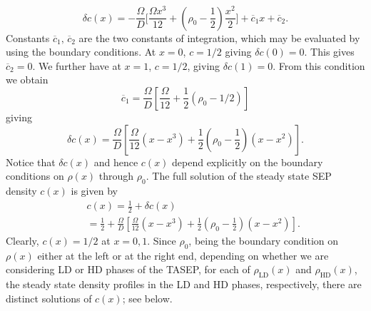 \documentclass[aps,pre,twocolumn,superscriptaddress,amsmath,amssymb,longbibliography,floatfix,nofootinbib]{revtex4}
\begin{document}
{\begin{equation}
  \delta c(x)=  -\frac{\Omega}{D}\bigg[\frac{\Omega x^3}{12} + (\rho_0-\frac{1}{2})\frac{x^2}{2}\bigg] + \overline c_1x + \overline c_2.
\end{equation}
 Constants $\overline c_1,\,\overline c_2$ are the two constants of integration, which may be evaluated by using the boundary conditions. At $x=0$, $c=1/2$ giving $\delta c(0)=0$. This gives $\overline c_2=0$. We further have at $x=1$, $c=1/2$, giving $\delta c(1)=0$. From this condition we obtain
 \begin{equation}
  \overline c_1=\frac{\Omega}{D}\left[\frac{\Omega}{12}+\frac{1}{2}(\rho_0-1/2)\right]
 \end{equation}
giving
\begin{equation}
 \delta c(x)=\frac{\Omega}{D}\left[\frac{\Omega}{12}(x-x^3)+\frac{1}{2}(\rho_0-\frac{1}{2})(x-x^2)\right].
\end{equation}
Notice that $\delta c(x)$ and hence $c(x)$ depend explicitly on the boundary conditions on $\rho(x)$ through $\rho_0$.
The full solution of the steady state SEP density $c(x)$ is given by
\begin{eqnarray}
 &&c(x)=\frac{1}{2} + \delta c(x)\nonumber \\
 &&=\frac{1}{2} +\frac{\Omega}{D}\left[\frac{\Omega}{12}(x-x^3)+\frac{1}{2}(\rho_0-\frac{1}{2})(x-x^2)\right].\label{full-c-large-D}
\end{eqnarray}
Clearly, $c(x)=1/2$ at $x=0,1$.
Since $\rho_0$, being the boundary condition on $\rho(x)$ either at the left or at the right end, depending on whether we are considering LD or HD phases of the TASEP,  for each of $\rho_\text{LD}(x)$ and $\rho_\text{HD}(x)$, the steady state density profiles in the LD and HD phases, respectively, there are distinct solutions of $c(x)$; see below.

}
\end{document}

